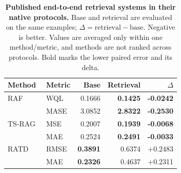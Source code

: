 \begin{table}[t]
\centering
\caption{\textbf{Published end-to-end retrieval systems in their native protocols.} Base and retrieval are evaluated on the same examples; $\Delta=\mathrm{retrieval}-\mathrm{base}$. Negative is better. Values are averaged only within one method/metric, and methods are not ranked across protocols. Bold marks the lower paired error and its delta.}
\label{tab:native-retrieval-values}
\small
\setlength{\tabcolsep}{3.5pt}
\begin{tabular}{@{}llrrr@{}}
\toprule
Method & Metric & Base & Retrieval & $\Delta$ \\
\midrule
RAF~\citep{tire2024raf} & WQL & 0.1666 & \textbf{0.1425} & \textbf{-0.0242} \\
 & MASE & 3.0852 & \textbf{2.8322} & \textbf{-0.2530} \\
\addlinespace
TS-RAG~\citep{ning2025tsrag} & MSE & 0.2007 & \textbf{0.1939} & \textbf{-0.0068} \\
 & MAE & 0.2524 & \textbf{0.2491} & \textbf{-0.0033} \\
\addlinespace
RATD~\citep{liu2024ratd} & RMSE & \textbf{0.3891} & 0.6374 & +0.2483 \\
 & MAE & \textbf{0.2326} & 0.4637 & +0.2311 \\
\bottomrule
\end{tabular}
\end{table}

